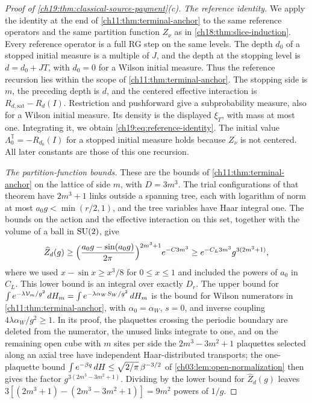 \begin{proof}[Proof of \cref{ch19:thm:classical-source-payment}(c)]
\emph{The reference identity.} We apply the identity at the end of \cref{ch11:thm:terminal-anchor} to the same reference operators and the same partition function $Z_\nu$ as in \cref{ch18:thm:slice-induction}. Every reference operator is a full RG step on the same levels. The depth $d_0$ of a stopped initial measure is a multiple of $J$, and the depth at the stopping level is $d=d_0+JT$, with $d_0=0$ for a Wilson initial measure. Thus the reference recursion lies within the scope of \cref{ch11:thm:terminal-anchor}. The stopping side is $m$, the preceding depth is $d$, and the centered effective interaction is $R_{d,\mathrm{sat}}-R_d(I)$. Restriction and pushforward give a subprobability measure, also for a Wilson initial measure. Its density is the displayed $\xi_T$, with mass at most one. Integrating it, we obtain \eqref{ch19:eq:reference-identity}. The initial value $\Lambda_0^{\mathbb T}=-R_{d_0}(I)$ for a stopped initial measure holds because $Z_\nu$ is not centered. All later constants are those of this one recursion.

\emph{The partition-function bounds.} These are the bounds of \cref{ch11:thm:terminal-anchor} on the lattice of side $m$, with $D=3m^3$. The trial configurations of that theorem have $2m^3+1$ links outside a spanning tree, each with logarithm of norm at most $a_0g<\min(r/2,1)$, and the tree variables have Haar integral one. The bounds on the action and the effective interaction on this set, together with the volume of a ball in $\mathrm{SU}(2)$, give
\[
 \widehat Z_d(g)\ge\Bigl(\frac{a_0g-\sin(a_0g)}{2\pi}\Bigr)^{2m^3+1}e^{-C3m^3}\ge e^{-C_L3m^3}g^{3(2m^3+1)},
\]
where we used $x-\sin x\ge x^3/8$ for $0\le x\le1$ and included the powers of $a_0$ in $C_L$. This lower bound is an integral over exactly $D_r$. The upper bound for $\int e^{-\lambda\mathcal V_m/g^2}\,dH_m=\int e^{-\lambda\alpha_WS_W/g^2}\,dH_m$ is the bound for Wilson numerators in \cref{ch11:thm:terminal-anchor}, with $\alpha_0=\alpha_W$, $s=0$, and inverse coupling $4\lambda\alpha_W/g^2\ge1$. In its proof, the plaquettes crossing the periodic boundary are deleted from the numerator, the unused links integrate to one, and on the remaining open cube with $m$ sites per side the $2m^3-3m^2+1$ plaquettes selected along an axial tree have independent Haar-distributed transports; the one-plaquette bound $\int e^{-\beta q}\,dH\le\sqrt{2/\pi}\,\beta^{-3/2}$ of \cref{ch03:lem:open-normalization} then gives the factor $g^{3(2m^3-3m^2+1)}$. Dividing by the lower bound for $\widehat Z_d(g)$ leaves $3[(2m^3+1)-(2m^3-3m^2+1)]=9m^2$ powers of $1/g$.


\end{proof}
